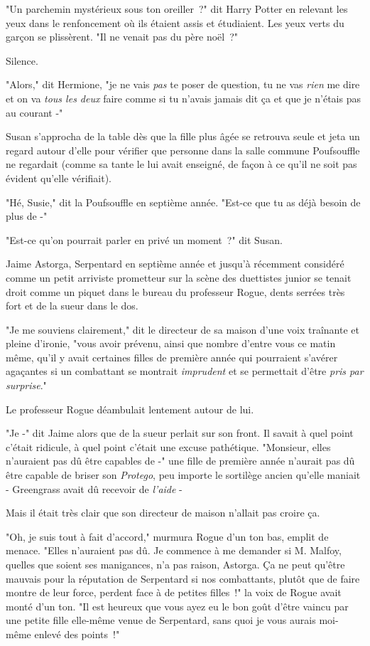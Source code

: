 \later

"Un parchemin mystérieux sous ton oreiller~?" dit Harry Potter en relevant les yeux dans le renfoncement où ils étaient assis et étudiaient. Les yeux verts du garçon se plissèrent. "Il ne venait pas du père noël~?"

Silence.

"Alors," dit Hermione, "je ne vais \emph{pas} te poser de question, tu ne vas \emph{rien} me dire et on va \emph{tous les deux} faire comme si tu n'avais jamais dit ça et que je n'étais pas au courant -"

\later

Susan s'approcha de la table dès que la fille plus âgée se retrouva seule et jeta un regard autour d'elle pour vérifier que personne dans la salle commune Poufsouffle ne regardait (comme sa tante le lui avait enseigné, de façon à ce qu'il ne soit pas évident qu'elle vérifiait).

"Hé, Susie," dit la Poufsouffle en septième année. "Est-ce que tu as déjà besoin de plus de -"

"Est-ce qu'on pourrait parler en privé un moment~?" dit Susan.

\later

Jaime Astorga, Serpentard en septième année et jusqu'à récemment considéré comme un petit arriviste prometteur sur la scène des duettistes junior se tenait droit comme un piquet dans le bureau du professeur Rogue, dents serrées très fort et de la sueur dans le dos.

"Je me souviens clairement," dit le directeur de sa maison d'une voix traînante et pleine d'ironie, "vous avoir prévenu, ainsi que nombre d'entre vous ce matin même, qu'il y avait certaines filles de première année qui pourraient s'avérer agaçantes si un combattant se montrait \emph{imprudent} et se permettait d'être \emph{pris par surprise}."

Le professeur Rogue déambulait lentement autour de lui.

"Je -" dit Jaime alors que de la sueur perlait sur son front. Il savait à quel point c'était ridicule, à quel point c'était une excuse pathétique. "Monsieur, elles n'auraient pas dû être capables de -" une fille de première année n'aurait pas dû être capable de briser son \emph{Protego}, peu importe le sortilège ancien qu'elle maniait - Greengrass avait dû recevoir de \emph{l'aide} -

Mais il était très clair que son directeur de maison n'allait pas croire ça.

"Oh, je suis tout à fait d'accord," murmura Rogue d'un ton bas, emplit de menace. "Elles n'auraient pas dû. Je commence à me demander si M. Malfoy, quelles que soient ses manigances, n'a pas raison, Astorga. Ça ne peut qu'être mauvais pour la réputation de Serpentard si nos combattants, plutôt que de faire montre de leur force, perdent face à de petites filles~!" la voix de Rogue avait monté d'un ton. "Il est heureux que vous ayez eu le bon goût d'être vaincu par une petite fille elle-même venue de Serpentard, sans quoi je vous aurais moi-même enlevé des points~!"

